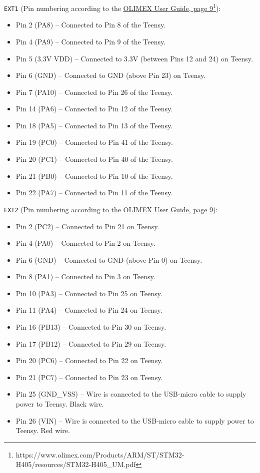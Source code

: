 \verb|EXT1| (Pin numbering according to the \href{https://www.olimex.com/Products/ARM/ST/STM32-H405/resources/STM32-H405_UM.pdf}{OLIMEX User Guide, page 9}\footnote{https://www.olimex.com/Products/ARM/ST/STM32-H405/resources/STM32-H405_UM.pdf}):
\begin{itemize}[noitemsep]
  \item Pin 2 (PA8) -- Connected to Pin 8 of the Teensy.
  \item Pin 4 (PA9) -- Connected to Pin 9 of the Teensy.
  \item Pin 5 (3.3V VDD) -- Connected to 3.3V (between Pins 12 and 24) on Teensy.
  \item Pin 6 (GND) -- Connected to GND (above Pin 23) on Teensy.
  \item Pin 7 (PA10) -- Connected to Pin 26 of the Teensy.
  \item Pin 14 (PA6) -- Connected to Pin 12 of the Teensy.
  \item Pin 18 (PA5) -- Connected to Pin 13 of the Teensy.
  \item Pin 19 (PC0) -- Connected to Pin 41 of the Teensy.
  \item Pin 20 (PC1) -- Connected to Pin 40 of the Teensy.
  \item Pin 21 (PB0) -- Connected to Pin 10 of the Teensy.
  \item Pin 22 (PA7) -- Connected to Pin 11 of the Teensy.
\end{itemize}

\verb|EXT2| (Pin numbering according to the \href{https://www.olimex.com/Products/ARM/ST/STM32-H405/resources/STM32-H405_UM.pdf}{OLIMEX User Guide, page 9}):
\begin{itemize}[noitemsep]
  \item Pin 2 (PC2) -- Connected to Pin 21 on Teensy.
  \item Pin 4 (PA0) -- Connected to Pin 2 on Teensy.
  \item Pin 6 (GND) -- Connected to GND (above Pin 0) on Teensy.
  \item Pin 8 (PA1) -- Connected to Pin 3 on Teensy.
  \item Pin 10 (PA3) -- Connected to Pin 25 on Teensy.
  \item Pin 11 (PA4) -- Connected to Pin 24 on Teensy.
  \item Pin 16 (PB13) -- Connected to Pin 30 on Teensy.
  \item Pin 17 (PB12) -- Connected to Pin 29 on Teensy.
  \item Pin 20 (PC6) -- Connected to Pin 22 on Teensy.
  \item Pin 21 (PC7) -- Connected to Pin 23 on Teensy.
  \item Pin 25 (GND\_VSS) -- Wire is connected to the USB-micro cable to supply power to Teensy. Black wire.
  \item Pin 26 (VIN) -- Wire is connected to the USB-micro cable to supply power to Teensy. Red wire.
\end{itemize}

